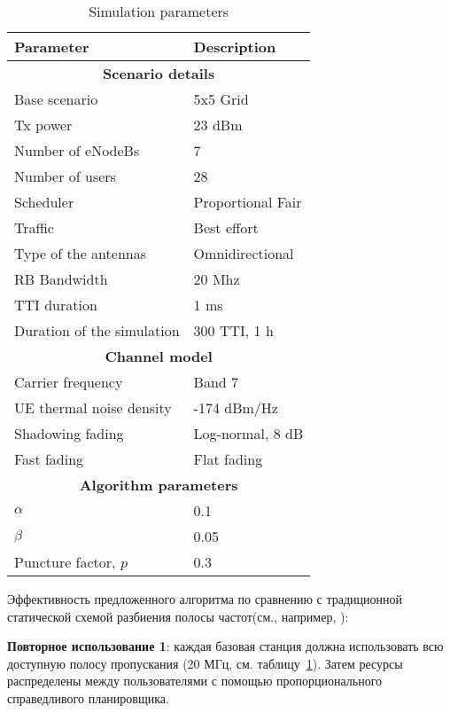 \begin{table}
\centering
    \caption{Simulation parameters}
    \begin{tabular}{|l l|} 
    \hline
    \textbf{Parameter} & \textbf{Description} \\
    \hline
    \multicolumn{2}{|c|}{\textbf{Scenario details}} \\
    \hline
    Base scenario & 5x5 Grid~\cite{R4-092042} \\
    \hline
    Tx power & 23 dBm \\
    \hline
    Number of eNodeBs & 7 \\
    \hline
    Number of users & 28 \\
    \hline
    Scheduler & Proportional Fair \\
    \hline
    Traffic & Best effort \\
    \hline
    Type of the antennas & Omnidirectional \\
    \hline
    RB Bandwidth & 20 Mhz \\
    \hline
    TTI duration & 1 ms \\
    \hline
    Duration of the simulation & 300 TTI, 1 h \\
    \hline
    \multicolumn{2}{|c|}{\textbf{Channel model}} \\
    \hline
    Carrier frequency & Band 7 \\
    \hline
    UE thermal noise density & -174 dBm/Hz \\
    \hline
    Shadowing fading & Log-normal, 8 dB \\
    \hline
    Fast fading & Flat fading \\
    \hline
    \multicolumn{2}{|c|}{\textbf{Algorithm parameters}} \\
    \hline
    $\alpha$ & 0.1 \\
    \hline
    $\beta$ & 0.05 \\
    \hline
    Puncture factor, $p$ & 0.3 \\
    \hline
    \end{tabular}
    \label{table:simulation_parameters}
\end{table}

Эффективность предложенного алгоритма по сравнению с традиционной статической схемой разбиения полосы частот(см., например, \cite{4907410}): 

\textbf{Повторное использование 1}: каждая базовая станция должна использовать всю доступную полосу пропускания (20 МГц, см. таблицу~\ref{table:simulation_parameters}). Затем ресурсы распределены между пользователями с помощью пропорционального справедливого планировщика.

